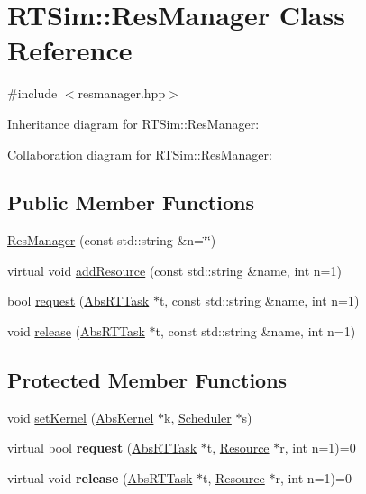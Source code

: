 \hypertarget{classRTSim_1_1ResManager}{}\section{R\+T\+Sim\+:\+:Res\+Manager Class Reference}
\label{classRTSim_1_1ResManager}


{\ttfamily \#include $<$resmanager.\+hpp$>$}



Inheritance diagram for R\+T\+Sim\+:\+:Res\+Manager\+:


Collaboration diagram for R\+T\+Sim\+:\+:Res\+Manager\+:
\subsection*{Public Member Functions}
\begin{DoxyCompactItemize}
\item 
\hyperlink{classRTSim_1_1ResManager_a8776daa038996a2b7d9d8eb00085ce08}{Res\+Manager} (const std\+::string \&n=\char`\"{}\char`\"{})
\item 
virtual void \hyperlink{classRTSim_1_1ResManager_af3ae1b90baf0e99f4f1399139ccc16cf}{add\+Resource} (const std\+::string \&name, int n=1)
\item 
bool \hyperlink{classRTSim_1_1ResManager_a2d83a47dc4ad6e795162bd84a82dc862}{request} (\hyperlink{classRTSim_1_1AbsRTTask}{Abs\+R\+T\+Task} $\ast$t, const std\+::string \&name, int n=1)
\item 
void \hyperlink{classRTSim_1_1ResManager_afc45d40200d175850d3f7ed89c22e939}{release} (\hyperlink{classRTSim_1_1AbsRTTask}{Abs\+R\+T\+Task} $\ast$t, const std\+::string \&name, int n=1)
\end{DoxyCompactItemize}
\subsection*{Protected Member Functions}
\begin{DoxyCompactItemize}
\item 
void \hyperlink{classRTSim_1_1ResManager_a1e83c22d28206ae8d8144b7ff1ffbd2c}{set\+Kernel} (\hyperlink{classRTSim_1_1AbsKernel}{Abs\+Kernel} $\ast$k, \hyperlink{classRTSim_1_1Scheduler}{Scheduler} $\ast$s)
\item 
virtual bool {\bfseries request} (\hyperlink{classRTSim_1_1AbsRTTask}{Abs\+R\+T\+Task} $\ast$t, \hyperlink{classRTSim_1_1Resource}{Resource} $\ast$r, int n=1)=0\hypertarget{classRTSim_1_1ResManager_a72e0099b8e6c501d4b742aa5e5adba66}{}\label{classRTSim_1_1ResManager_a72e0099b8e6c501d4b742aa5e5adba66}

\item 
virtual void {\bfseries release} (\hyperlink{classRTSim_1_1AbsRTTask}{Abs\+R\+T\+Task} $\ast$t, \hyperlink{classRTSim_1_1Resource}{Resource} $\ast$r, int n=1)=0\hypertarget{classRTSim_1_1ResManager_a027cadfc2b064bd3de994fa1345c8c73}{}\label{classRTSim_1_1ResManager_a027cadfc2b064bd3de994fa1345c8c73}

\end{DoxyCompactItemize}
